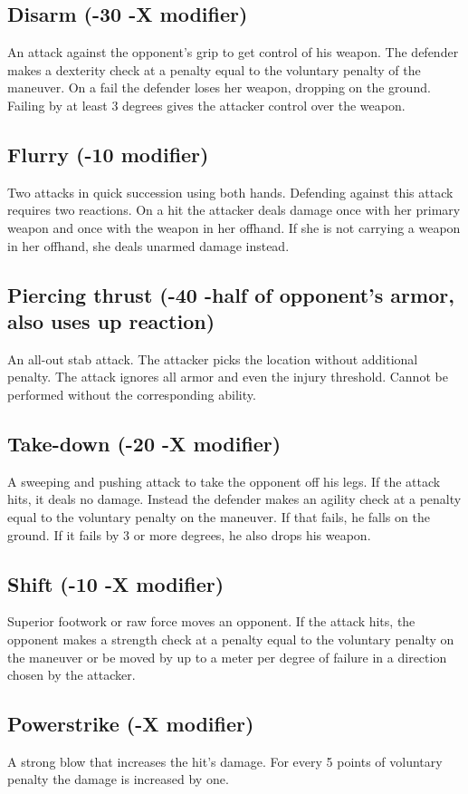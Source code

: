 \documentclass[12pt,a4paper,openany]{book}
\begin{document}
	\subsection*{Disarm (-30 -X modifier)}
	An attack against the opponent’s grip to get control of his weapon. The defender makes a dexterity check at a penalty equal to the voluntary penalty of the maneuver. On a fail the defender loses her weapon, dropping on the ground. Failing by at least 3 degrees gives the attacker control over the weapon.
	\subsection*{Flurry (-10 modifier)}
	Two attacks in quick succession using both hands. Defending against this attack requires two reactions. On a hit the attacker deals damage once with her primary weapon and once with the weapon in her offhand. If she is not carrying a weapon in her offhand, she deals unarmed damage instead. 
	\subsection*{Piercing thrust (-40 -half of opponent’s armor, also uses up reaction)}
	An all-out stab attack. The attacker picks the location without additional penalty. The attack ignores all armor and even the injury threshold. Cannot be performed without the corresponding ability.
	\subsection*{Take-down (-20 -X modifier)}
	A sweeping and pushing attack to take the opponent off his legs. If the attack hits, it deals no damage. Instead the defender makes an agility check at a penalty equal to the voluntary penalty on the maneuver. If that fails, he falls on the ground. If it fails by 3 or more degrees, he also drops his weapon.
	\subsection*{Shift (-10 -X modifier)}
	Superior footwork or raw force moves an opponent. If the attack hits, the opponent makes a strength check at a penalty equal to the voluntary penalty on the maneuver or be moved by up to a meter per degree of failure in a direction chosen by the attacker.
	\subsection*{Powerstrike (-X modifier)}
	A strong blow that increases the hit’s damage. For every 5 points of voluntary penalty the damage is increased by one.
\end{document}

